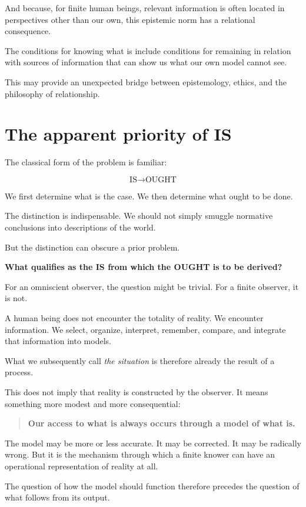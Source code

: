 \documentclass{article}
\begin{document}
And because, for finite human beings, relevant information is often located in perspectives other than our own, this epistemic norm has a relational consequence.

The conditions for knowing what is include conditions for remaining in relation with sources of information that can show us what our own model cannot see.

This may provide an unexpected bridge between epistemology, ethics, and the philosophy of relationship.

\section*{The apparent priority of IS}

The classical form of the problem is familiar:

\[
\text{IS} \rightarrow \text{OUGHT}
\]

We first determine what is the case. We then determine what ought to be done.

The distinction is indispensable. We should not simply smuggle normative conclusions into descriptions of the world.

But the distinction can obscure a prior problem.

\textbf{What qualifies as the IS from which the OUGHT is to be derived?}

For an omniscient observer, the question might be trivial. For a finite observer, it is not.

A human being does not encounter the totality of reality. We encounter information. We select, organize, interpret, remember, compare, and integrate that information into models.

What we subsequently call \textit{the situation} is therefore already the result of a process.

This does not imply that reality is constructed by the observer. It means something more modest and more consequential:

\begin{quote}
    \textbf{Our access to what is always occurs through a model of what is.}
\end{quote}

The model may be more or less accurate. It may be corrected. It may be radically wrong. But it is the mechanism through which a finite knower can have an operational representation of reality at all.

The question of how the model should function therefore precedes the question of what follows from its output.
\end{document}
